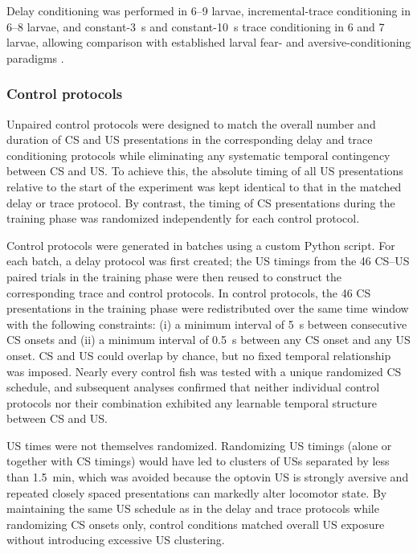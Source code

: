 Delay conditioning was performed in \SIrange{6}{9}{\dpf} larvae, incremental-trace conditioning in \SIrange{6}{8}{\dpf} larvae, and constant-\SI{3}{\second} and constant-\SI{10}{\second} trace conditioning in \SI{6}{\dpf} and \SI{7}{\dpf} larvae, allowing comparison with established larval fear- and aversive-conditioning paradigms \citep{aizenbergCerebellarDependentLearningLarval2011,matsudaGranuleCellsControl2017}.

\subsubsection{Control protocols}

Unpaired control protocols were designed to match the overall number and duration of CS and US presentations in the corresponding delay and trace conditioning protocols while eliminating any systematic temporal contingency between CS and US. To achieve this, the absolute timing of all US presentations relative to the start of the experiment was kept identical to that in the matched delay or trace protocol. By contrast, the timing of CS presentations during the training phase was randomized independently for each control protocol.

Control protocols were generated in batches using a custom Python script. For each batch, a delay protocol was first created; the US timings from the 46 CS--US paired trials in the training phase were then reused to construct the corresponding trace and control protocols. In control protocols, the 46 CS presentations in the training phase were redistributed over the same time window with the following constraints: (i) a minimum interval of \SI{5}{\second} between consecutive CS onsets and (ii) a minimum interval of \SI{0.5}{\second} between any CS onset and any US onset. CS and US could  overlap by chance, but no fixed temporal relationship was imposed. Nearly every control fish was tested with a unique randomized CS schedule, and subsequent analyses confirmed that neither individual control protocols nor their combination exhibited any learnable temporal structure between CS and US.

US times were not themselves randomized. Randomizing US timings (alone or together with CS timings) would have led to clusters of USs separated by less than \SI{1.5}{\minute}, which was avoided because the optovin US is strongly aversive and repeated closely spaced presentations can markedly alter locomotor state. By maintaining the same US schedule as in the delay and trace protocols while randomizing CS onsets only, control conditions matched overall US exposure without introducing excessive US clustering.

